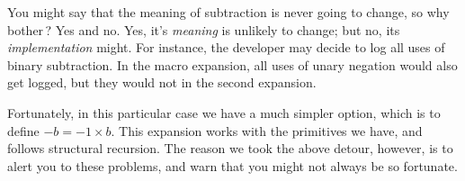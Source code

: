 \begin{enumerate}
You might say that the meaning of subtraction is never going to change, so why
bother\,? Yes and no. Yes, it’s \emph{meaning} is unlikely to change; but no,
its \emph{implementation} might. For instance, the developer may decide to log
all uses of binary subtraction. In the macro expansion, all uses of unary
negation would also get logged, but they would not in the second expansion.

\end{enumerate}

Fortunately, in this particular case we have a much simpler option, which is to
define $-b=-1\times b$. This expansion works with the primitives we have, and
follows structural recursion. The reason we took the above detour, however, is
to alert you to these problems, and warn that you might not always be so
fortunate.

